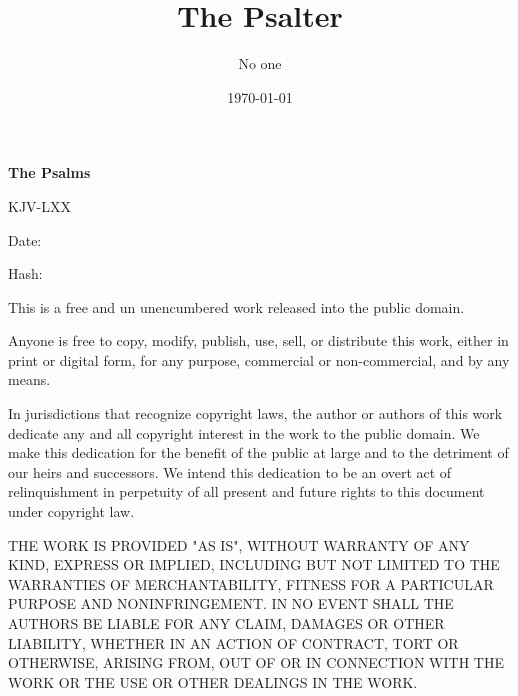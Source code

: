 \documentclass[12pt,openany]{book}
\title{The Psalter}
\author{No one}
\date{\today}
\begin{document}
\begin{titlepage}
  \begin{center}

  \begin{Huge}
  \textbf{The Psalms}
  \end{Huge}

  \vspace{0.25in}
  KJV-LXX

  \vspace{2ex}

  \begin{footnotesize}
  Date: 

  Hash: 
  \end{footnotesize}
  \end{center}

  \vspace{2ex}

  \begin{footnotesize}
  \noindent
  This is a free and un unencumbered work released into the public domain.
  \vspace{2ex}

  \noindent
  Anyone is free to copy, modify, publish, use, sell, or distribute this work, either in print or digital form, for any purpose, commercial or non-commercial, and by any means.
  \vspace{2ex}

  \noindent
  In jurisdictions that recognize copyright laws, the author or authors of this work dedicate any and all copyright interest in the work to the public domain. We make this dedication for the benefit of the public at large and to the detriment of our heirs and successors. We intend this dedication to be an overt act of relinquishment in perpetuity of all present and future rights to this document under copyright law.
  \vspace{2ex}

  \noindent
  THE WORK IS PROVIDED "AS IS", WITHOUT WARRANTY OF ANY KIND, EXPRESS OR IMPLIED, INCLUDING BUT NOT LIMITED TO THE WARRANTIES OF MERCHANTABILITY, FITNESS FOR A PARTICULAR PURPOSE AND NONINFRINGEMENT. IN NO EVENT SHALL THE AUTHORS BE LIABLE FOR ANY CLAIM, DAMAGES OR OTHER LIABILITY, WHETHER IN AN ACTION OF CONTRACT, TORT OR OTHERWISE, ARISING FROM, OUT OF OR IN CONNECTION WITH THE WORK OR THE USE OR OTHER DEALINGS IN THE WORK.
  \end{footnotesize}

  \vfill
\end{titlepage}

\newpage



\newpage

\thispagestyle{empty}
\ %

\newpage

\newpage
\pagestyle{plain}
\end{document}
